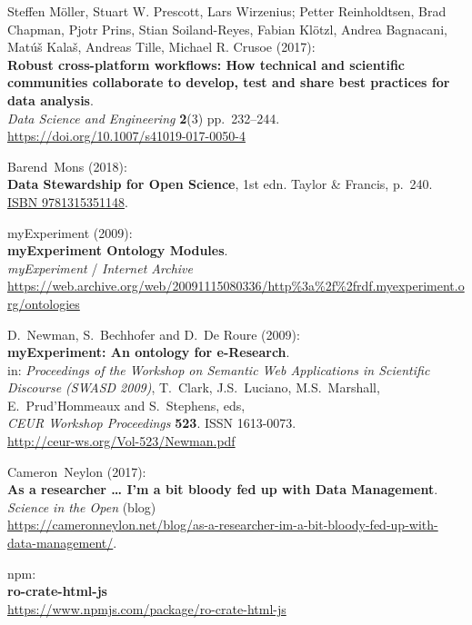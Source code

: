 \begin{thebibliography}{9}
Steffen Möller, Stuart W. Prescott, Lars Wirzenius; Petter
Reinholdtsen, Brad Chapman, Pjotr Prins, Stian Soiland-Reyes, Fabian
Klötzl, Andrea Bagnacani, Matúš Kalaš, Andreas Tille, Michael R. Crusoe
(2017):\\
\textbf{Robust cross-platform workflows: How technical and scientific
communities collaborate to develop, test and share best practices for
data analysis}.\\
\emph{Data Science and Engineering} \textbf{2}(3) pp.~232--244.\\
\url{https://doi.org/10.1007/s41019-017-0050-4}

Barend~Mons (2018):\\
\textbf{Data Stewardship for Open Science}, 1st edn. Taylor \& Francis,
p.~240. \href{https://identifiers.org/isbn/9781315351148}{ISBN
9781315351148}.

myExperiment (2009):\\
\textbf{myExperiment Ontology Modules}.\\
\emph{myExperiment} / \emph{Internet Archive}\\
\url{https://web.archive.org/web/20091115080336/http\%3a\%2f\%2frdf.myexperiment.org/ontologies}

D.~Newman, S.~Bechhofer and D.~De Roure (2009):\\
\textbf{myExperiment: An ontology for e-Research}.\\
in: \emph{Proceedings of the Workshop on Semantic Web Applications in
Scientific Discourse (SWASD 2009)}, T.~Clark, J.S.~Luciano,
M.S.~Marshall, E.~Prud'Hommeaux and S.~Stephens, eds,\\
\emph{CEUR Workshop Proceedings} \textbf{523}. ISSN 1613-0073.\\
\url{http://ceur-ws.org/Vol-523/Newman.pdf}

Cameron~Neylon (2017):\\
\textbf{As a researcher \ldots{} I'm a bit bloody fed up with Data
Management}.\\
\emph{Science in the Open} (blog)\\
\url{https://cameronneylon.net/blog/as-a-researcher-im-a-bit-bloody-fed-up-with-data-management/}.

npm:\\
\textbf{ro-crate-html-js}\\
\url{https://www.npmjs.com/package/ro-crate-html-js}


\end{thebibliography}
